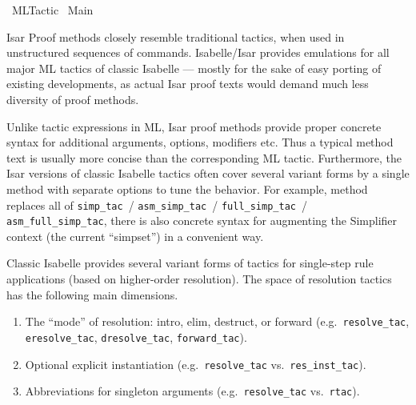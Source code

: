 %
\begin{isabellebody}%
\def\isabellecontext{ML{\isacharunderscore}Tactic}%
%
\isadelimtheory
%
\endisadelimtheory
%
\isatagtheory
{}\isamarkupfalse%
\ ML{\isacharunderscore}Tactic\isanewline
{}\ Main\isanewline
{}%
\endisatagtheory
{\isafoldtheory}%
%
\isadelimtheory
%
\endisadelimtheory
%
\isamarkuptrue%
%
\begin{isamarkuptext}%
Isar Proof methods closely resemble traditional tactics, when used
  in unstructured sequences of \hyperlink{command.apply}{\mbox{}} commands.
  Isabelle/Isar provides emulations for all major ML tactics of
  classic Isabelle --- mostly for the sake of easy porting of existing
  developments, as actual Isar proof texts would demand much less
  diversity of proof methods.

  Unlike tactic expressions in ML, Isar proof methods provide proper
  concrete syntax for additional arguments, options, modifiers etc.
  Thus a typical method text is usually more concise than the
  corresponding ML tactic.  Furthermore, the Isar versions of classic
  Isabelle tactics often cover several variant forms by a single
  method with separate options to tune the behavior.  For example,
  method \hyperlink{method.simp}{\mbox{}} replaces all of \verb|simp_tac|~/ \verb|asm_simp_tac|~/ \verb|full_simp_tac|~/ \verb|asm_full_simp_tac|, there
  is also concrete syntax for augmenting the Simplifier context (the
  current ``simpset'') in a convenient way.%
\end{isamarkuptext}%
\isamarkuptrue%
%
\isamarkuptrue%
%
\begin{isamarkuptext}%
Classic Isabelle provides several variant forms of tactics for
  single-step rule applications (based on higher-order resolution).
  The space of resolution tactics has the following main dimensions.

  \begin{enumerate}

  \item The ``mode'' of resolution: intro, elim, destruct, or forward
  (e.g.\ \verb|resolve_tac|, \verb|eresolve_tac|, \verb|dresolve_tac|,
  \verb|forward_tac|).

  \item Optional explicit instantiation (e.g.\ \verb|resolve_tac| vs.\
  \verb|res_inst_tac|).

  \item Abbreviations for singleton arguments (e.g.\ \verb|resolve_tac|
  vs.\ \verb|rtac|).


\end{enumerate}
\end{isamarkuptext}
\end{isabellebody}
